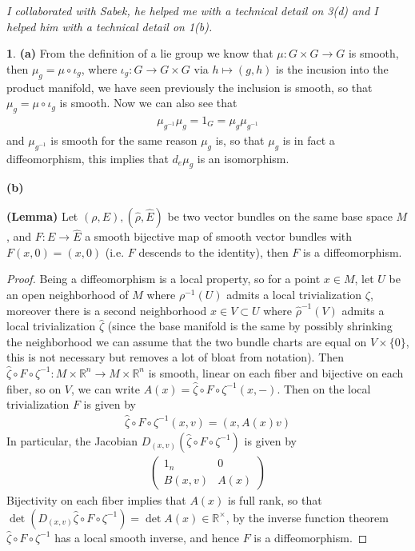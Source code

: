 \documentclass[10.5pt]{article}
\theoremstyle{definition}
\newtheorem{pb}{}
\newcommand{\set}[1]{\{#1\}}
\begin{document}
    \emph{I collaborated with Sabek, he helped me with a technical detail on 3(d) and I helped him with a technical detail on 1(b).}

    \begin{pb}
        \textbf{(a)} From the definition of a lie group we know that \(\mu: G\times G \to G\) is smooth, then \(\mu_g = \mu \circ \iota_g\), where \(\iota_g: G \to G \times G\) via \(h \mapsto (g,h)\) is the incusion into the product manifold, we have seen previously the inclusion is smooth, so that \(\mu_g = \mu \circ\iota_g\) is smooth. Now we can also see that
        \begin{align*}
            \mu_{g^{-1}}\mu_g = 1_G = \mu_g\mu_{g^{-1}}
        \end{align*}
        and \(\mu_{g^{-1}}\) is smooth for the same reason \(\mu_g\) is, so that \(\mu_g\) is in fact a diffeomorphism, this implies that \(d_e\mu_g\) is an isomorphism.

        \textbf{(b)} 
        
        \textbf{(Lemma)} Let \((\rho,E), (\widehat{\rho},\widehat{E})\) be two vector bundles on the same base space \(M\), and \(F: E \to \widehat{E}\) a smooth bijective map of smooth vector bundles with \(F(x,0) = (x,0)\) (i.e. \(F\) descends to the identity), then \(F\) is a diffeomorphism.
        \begin{proof}
            Being a diffeomorphism is a local property, so for a point \(x \in M\), let \(U\) be an open neighborhood of \(M\) where \(\rho^{-1}(U)\) admits a local trivialization \(\zeta\), moreover there is a second neighborhood \(x \in V \subset U\) where \(\widehat{\rho}^{-1}(V)\) admits a local trivialization \(\widehat{\zeta}\) (since the base manifold is the same by possibly shrinking the neighborhood we can assume that the two bundle charts are equal on \(V\times \set{0}\), this is not necessary but removes a lot of bloat from notation). Then \(\widehat{\zeta}\circ F\circ\zeta^{-1}: M \times \mathbb{R}^n \to M \times \mathbb{R}^n\) is smooth, linear on each fiber and bijective on each fiber, so on \(V\), we can write \(A(x) = \widehat{\zeta}\circ F\circ\zeta^{-1}(x,-)\). Then on the local trivialization \(F\) is given by
            \begin{align*}
                \widehat{\zeta}\circ F\circ\zeta^{-1}(x,v) = (x,A(x)v)
            \end{align*}
            In particular, the Jacobian \(D_{(x,v)} (\widehat{\zeta}\circ F\circ\zeta^{-1})\) is given by
            \begin{align*}
                \begin{pmatrix} 1_n & 0 \\ B(x,v) & A(x) \end{pmatrix}
            \end{align*}
            Bijectivity on each fiber implies that \(A(x)\) is full rank, so that \(\det (D_{(x,v)} \widehat{\zeta}\circ F\circ\zeta^{-1}) = \det A(x) \in \mathbb{R}^\times\), by the inverse function theorem \(\widehat{\zeta}\circ F\circ\zeta^{-1}\) has a local smooth inverse, and hence \(F\) is a diffeomorphism.
        \end{proof}
        

\end{pb}
\end{document}
